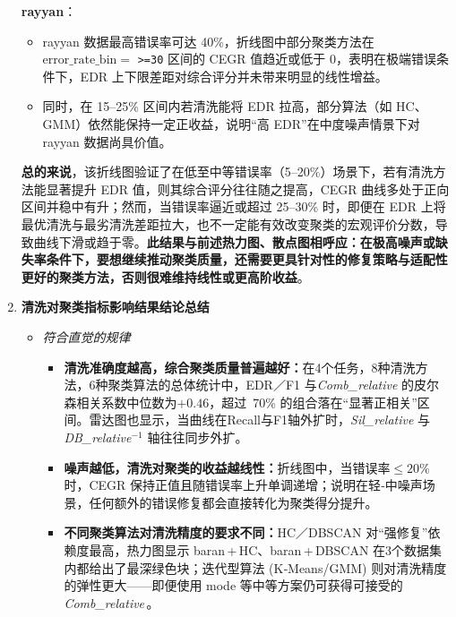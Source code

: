 \documentclass[10pt]{article} %
\numberwithin{equation}{section}
\begin{document}
\begin{enumerate}[label=(\alph*)]
\textbf{rayyan}：
    \begin{itemize}
        \item rayyan 数据最高错误率可达 40\%，折线图中部分聚类方法在 \(\mathrm{error\_rate\_bin} = \) \texttt{>=30} 区间的 CEGR 值趋近或低于 0，表明在极端错误条件下，EDR 上下限差距对综合评分并未带来明显的线性增益。
        \item 同时，在 15--25\% 区间内若清洗能将 EDR 拉高，部分算法（如 HC、GMM）依然能保持一定正收益，说明“高 EDR”在中度噪声情景下对 rayyan 数据尚具价值。
    \end{itemize}

\noindent
\textbf{总的来说}，该折线图验证了在低至中等错误率（5--20\%）场景下，若有清洗方法能显著提升 EDR 值，则其综合评分往往随之提高，CEGR 曲线多处于正向区间并稳中有升；然而，当错误率逼近或超过 25--30\% 时，即便在 EDR 上将最优清洗与最劣清洗差距拉大，也不一定能有效改变聚类的宏观评价分数，导致曲线下滑或趋于零。\textbf{此结果与前述热力图、散点图相呼应：在极高噪声或缺失率条件下，要想继续推动聚类质量，还需要更具针对性的修复策略与适配性更好的聚类方法，否则很难维持线性或更高阶收益}。  
    \item \textbf{清洗对聚类指标影响结果结论总结}\\[-0.4em]
\begin{itemize}
    \item \emph{符合直觉的规律}\\[-0.2em]
    \begin{itemize}
        \item \textbf{清洗准确度越高，综合聚类质量普遍越好：}在4个任务，8种清洗方法，6种聚类算法的总体统计中，EDR／F1 与\textit{Comb\_relative} 的皮尔森相关系数中位数为$+0.46$，超过 70\% 的组合落在“显著正相关”区间。雷达图也显示，当曲线在Recall与F1轴外扩时，\textit{Sil\_relative} 与 \textit{DB\_relative}$^{-1}$ 轴往往同步外扩。  
        \item \textbf{噪声越低，清洗对聚类的收益越线性：}折线图中，当错误率$\le20\%$ 时，CEGR 保持正值且随错误率上升单调递增；说明在轻‑中噪声场景，任何额外的错误修复都会直接转化为聚类得分提升。  
        \item \textbf{不同聚类算法对清洗精度的要求不同：}HC／DBSCAN 对“强修复”依赖度最高，热力图显示 baran\,+\,HC、baran\,+\,DBSCAN 在3个数据集内都给出了最深绿色块；迭代型算法 (K‑Means/GMM) 则对清洗精度的弹性更大——即便使用 mode 等中等方案仍可获得可接受的 \textit{Comb\_relative}\,。  
    \end{itemize}


\end{itemize}
\end{enumerate}
\end{document}
